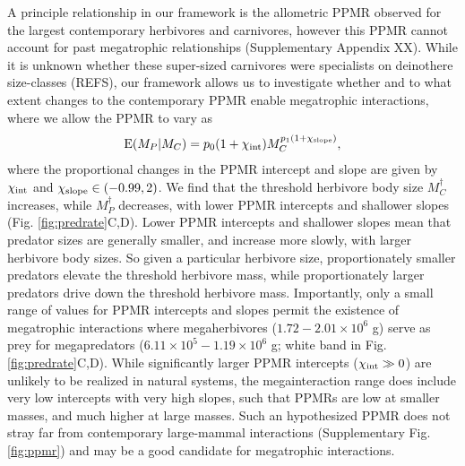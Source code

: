 \documentclass[]{rsos}%
\begin{document}
A principle relationship in our framework is the allometric PPMR observed for the largest contemporary herbivores and carnivores, however this PPMR cannot account for past megatrophic relationships (Supplementary Appendix XX).
While it is unknown whether these super-sized carnivores were specialists on deinothere size-classes (REFS), our framework allows us to investigate whether and to what extent changes to the contemporary PPMR enable megatrophic interactions, where we allow the PPMR to vary as 
\begin{equation}
{\rm E}(M_P|M_C) = p_0(1+\chi_{\rm int}) M_C^{p_1(1+\chi_{\rm slope})},
\label{eq:ppmr}
\end{equation}
where the proportional changes in the PPMR intercept and slope are given by $\chi_{\rm int}$ and $\chi_{\rm slope} \in (-0.99,2)$.
We find that the threshold herbivore body size $M_C^\dagger$ increases, while $M_P^\dagger$ decreases, with lower PPMR intercepts and shallower slopes (Fig. \ref{fig:predrate}C,D). %
Lower PPMR intercepts and shallower slopes mean that predator sizes are generally smaller, and increase more slowly, with larger herbivore body sizes.
So given a particular herbivore size, proportionately smaller predators elevate the threshold herbivore mass, while proportionately larger predators drive down the threshold herbivore mass.
Importantly, only a small range of values for PPMR intercepts and slopes permit the existence of megatrophic interactions where megaherbivores ($1.72-2.01\times10^6$ g) serve as prey for megapredators ($6.11\times10^5-1.19\times10^6$ g; white band in Fig. \ref{fig:predrate}C,D).
While significantly larger PPMR intercepts ($\chi_{\rm int}\gg 0$) are unlikely to be realized in natural systems, the megainteraction range does include very low intercepts with very high slopes, such that PPMRs are low at smaller masses, and much higher at large masses.
Such an hypothesized PPMR does not stray far from contemporary large-mammal interactions  (Supplementary Fig. \ref{fig:ppmr}) and may be a good candidate for megatrophic interactions. 
\end{document}
